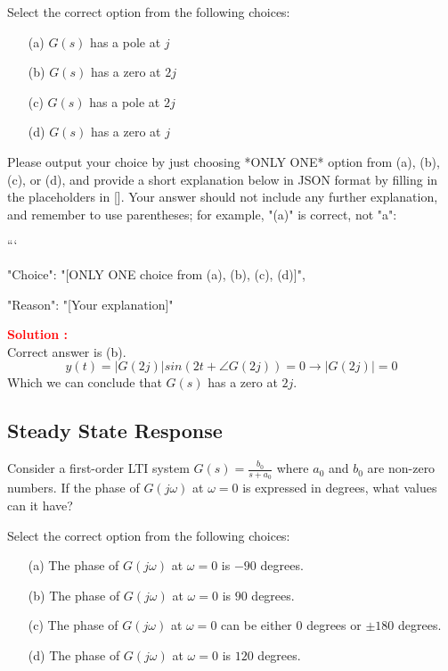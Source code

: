 \documentclass[12pt]{article}
\begin{document}
Select the correct option from the following choices:
\begin{enumerate}
    \item [(a)] \(G(s)\) has a pole at \(j\)
    \item [(b)] \(G(s)\) has a zero at \(2j\)
    \item [(c)] \(G(s)\) has a pole at \(2j\)
    \item [(d)] \(G(s)\) has a zero at \(j\)
\end{enumerate}

Please output your choice by just choosing *ONLY ONE* option from (a), (b), (c), or (d), and provide a short explanation below in JSON format by filling in the placeholders in []. Your answer should not include any further explanation, and remember to use parentheses; for example, "(a)" is correct, not "a": 

```
{

"Choice": "[ONLY ONE choice from (a), (b), (c), (d)]",

"Reason": "[Your explanation]"

}



\textbf{\textcolor{red}{Solution :}}\\
Correct answer is (b).\\
\[y(t) = |G(2j)|sin(2t+\angle G(2j)) = 0 \rightarrow |G(2j)| = 0\]
Which we can conclude that \(G(s)\) has a zero at \(2j\).
\clearpage

\subsection{Steady State Response}

Consider a first-order LTI system \(G(s) = \frac{b_0}{s+a_0} \) where \(a_0\) and \(b_0\) are non-zero numbers. If the phase of \(G(j\omega)\) at \(\omega = 0\) is expressed in degrees, what values can it have?

Select the correct option from the following choices:
\begin{enumerate}
    \item [(a)] The phase of \(G(j\omega)\) at \(\omega = 0\) is \(-90\) degrees.
    \item [(b)] The phase of \(G(j\omega)\) at \(\omega = 0\) is \(90\) degrees.
    \item [(c)] The phase of \(G(j\omega)\) at \(\omega = 0\) can be either \(0\) degrees or \(\pm 180\) degrees.
    \item [(d)] The phase of \(G(j\omega)\) at \(\omega = 0\) is \(120\) degrees.
\end{enumerate}
\end{document}
